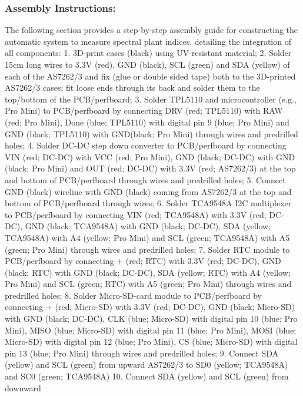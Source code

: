 \documentclass[
  11pt,
  letterpaper,
]{book}
\begin{document}
\subsubsection{Assembly
Instructions:}\label{sec-automatic-spectral-assembly}

The following section provides a step-by-step assembly guide for
constructing the automatic system to measure spectral plant indices,
detailing the integration of all components: 1. 3D-print cases (black)
using UV-resistant material; 2. Solder 15cm long wires to 3.3V (red),
GND (black), SCL (green) and SDA (yellow) of each of the AS7262/3 and
fix (glue or double sided tape) both to the 3D-printed AS7262/3 cases;
fit loose ends through its back and solder them to the top/bottom of the
PCB/perfboard; 3. Solder TPL5110 and microcontroller (e.g., Pro Mini) to
PCB/perfboard by connecting DRV (red; TPL5110) with RAW (red; Pro Mini),
Done (blue; TPL5110) with digital pin 9 (blue; Pro Mini) and GND (black;
TPL5110) with GND(black; Pro Mini) through wires and predrilled holes;
4. Solder DC-DC step down converter to PCB/perfboard by connecting VIN
(red; DC-DC) with VCC (red; Pro Mini), GND (black; DC-DC) with GND
(black; Pro Mini) and OUT (red; DC-DC) with 3.3V (red; AS7262/3) at the
top and bottom of PCB/perfboard through wires and predrilled holes; 5.
Connect GND (black) wireline with GND (black) coming from AS7262/3 at
the top and bottom of PCB/perfboard through wires; 6. Solder TCA9548A
I2C multiplexer to PCB/perfboard by connecting VIN (red; TCA9548A) with
3.3V (red; DC-DC), GND (black; TCA9548A) with GND (black; DC-DC), SDA
(yellow; TCA9548A) with A4 (yellow; Pro Mini) and SCL (green; TCA9548A)
with A5 (green; Pro Mini) through wires and predrilled holes; 7. Solder
RTC module to PCB/perfboard by connecting + (red; RTC) with 3.3V (red;
DC-DC), GND (black; RTC) with GND (black; DC-DC), SDA (yellow; RTC) with
A4 (yellow; Pro Mini) and SCL (green; RTC) with A5 (green; Pro Mini)
through wires and predrilled holes; 8. Solder Micro-SD-card module to
PCB/perfboard by connecting + (red; Micro-SD) with 3.3V (red; DC-DC),
GND (black; Micro-SD) with GND (black; DC-DC), CLK (blue; Micro-SD) with
digital pin 10 (blue; Pro Mini), MISO (blue; Micro-SD) with digital pin
11 (blue; Pro Mini), MOSI (blue; Micro-SD) with digital pin 12 (blue;
Pro Mini), CS (blue; Micro-SD) with digital pin 13 (blue; Pro Mini)
through wires and predrilled holes; 9. Connect SDA (yellow) and SCL
(green) from upward AS7262/3 to SD0 (yellow; TCA9548A) and SC0 (green;
TCA9548A) 10. Connect SDA (yellow) and SCL (green) from downward
\end{document}
